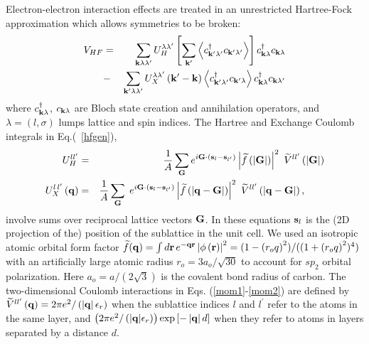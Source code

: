 \documentclass[twocolumn,prb,showpacs,preprintnumbers,amsmath,amssymb]{revtex4}
\begin{document}
Electron-electron interaction effects are treated in an unrestricted Hartree-Fock approximation \cite{dirachf,jeilbilayer}
which allows symmetries to be broken:  
\begin{eqnarray}
\label{hfgen}
V_{HF} &=& \sum_{{\bf k} \lambda \lambda^{\prime}} U_H^{\lambda \lambda^{\prime}}
\left[ \sum_{{\bf k}^{\prime}}
\left<  c^{\dag}_{{\bf k}^{\prime} \lambda^{\prime}} c_{{\bf k}^{\prime} \lambda^{\prime}} \right>  \right]
c^{\dag}_{{\bf k} \lambda} c_{{\bf k} \lambda}   \nonumber  \\  %
&-& \sum_{{\bf k}^{\prime}\lambda \lambda^{\prime}} U_{X}^{\lambda \lambda'}
\left({\bf k}^{\prime} - {\bf k} \right)
\left<  c^{\dag}_{{\bf k}^{\prime} \lambda^{\prime}} c_{{\bf k}^{\prime} \lambda} \right>
c^{\dag}_{{\bf k} \lambda} c_{{\bf k} \lambda^{\prime}} 
\end{eqnarray}
where $c^{\dag}_{{\bf k} \lambda}$, $c_{{\bf k} \lambda}$ are Bloch state creation and 
annihilation operators, and $\lambda = (l,\sigma)$ lumps lattice and spin indices. 
The Hartree and Exchange Coulomb integrals in Eq.(~\ref{hfgen}), 
\begin{eqnarray}
U_H^{l l^{\prime}} &=&  \frac{1}{A} \sum_{\bf G} e^{ i {\bf G} \cdot \left({\bf s}_{l} - {\bf s}_{l^{\prime}} \right) } 
\left| \widetilde{f}\left( \left| {\bf G}   \right|\right) \right|^2 \,\, \widetilde{V}^{l l^{\prime}} \left( \left|  {\bf G}   \right|  \right)  \label{mom1}
\\
U_X^{l \, l^{\prime}} \left( {\bf q} \right)    
&=& \frac{1}{A} \sum_{\bf G} \; e^{  i {\bf G} \cdot \left({\bf s}_{l} - {\bf s}_{l^{\prime}} \right) } 
\left| \widetilde{f} \left( \left| {\bf q}  -  {\bf G}  \right|\right) \right|^2 \,\, \widetilde{V}^{l l^{\prime}}
\left( \left|  {\bf q} - {\bf G}  \right|  \right), \quad \quad   \label{mom2}
\end{eqnarray}
involve sums over reciprocal lattice vectors ${\bf G}$.
In these equations ${\bf s}_l$ is the (2D projection of the) position of the sublattice in the unit cell.
We used an isotropic atomic orbital form factor 
$\widetilde{f}({\bf q}) = \int d{\bf r} \, e^{- {\bf q} {\bf r}}  \left| \phi \left( {\bf r} \right) \right|^2  %
= (1 -  \left(r_o q\right)^2 ) / (  (1 + \left(r_o q \right)^2 )^4  )$
with an artificially large atomic radius $r_o = 3a_o/\sqrt{30}$ to account for 
$sp_2$ orbital polarization.\cite{dirachf}
Here $a_o = a/\left(2 \sqrt{3}\right)$ is the covalent bond radius of carbon.
The two-dimensional Coulomb interactions in  Eqs. (\ref{mom1}-\ref{mom2}) are defined by
$\widetilde{V}^{l l^{\prime}} \left( {\bf q} \right) =  2 \pi e^2 / \left(  \left| \bf q \right|   \epsilon_r \right)  $
when the sublattice indices $l$ and $l^{\prime}$ refer to the atoms in the same layer, and 
$\left( 2 \pi e^2 /\left( { \left| \bf q \right|}   \epsilon_r \right)  \right)  \exp{ \left[  - \left| {\bf q} \right|  d \right] } $
when they refer to atoms in layers separated by a distance $d$.
\end{document}
